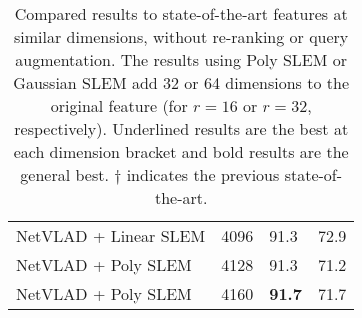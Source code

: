 \begin{table}[t]
\begin{center}
\begin{tabular}{l|c|ll}
NetVLAD + Linear SLEM & 4096 & 91.3 & 72.9 \\
NetVLAD + Poly SLEM & 4128 & 91.3 & 71.2 \\
NetVLAD + Poly SLEM & 4160 & \bf{91.7} & 71.7 \\
\hline 
\end{tabular}
\caption{Compared results to state-of-the-art features at similar dimensions, without re-ranking or query augmentation. The results using Poly SLEM or Gaussian SLEM add 32 or 64 dimensions to the original feature (for $r=16$ or $r=32$, respectively). Underlined results are the best at each dimension bracket and bold results are the general best. $\dag$ indicates the previous state-of-the-art.}
\label{sota}
\end{center}
\end{table}


